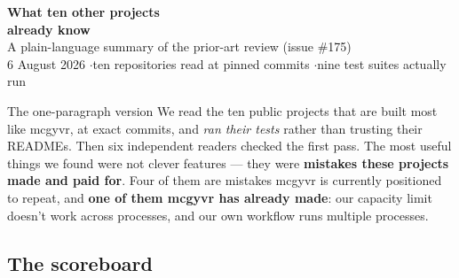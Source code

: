 \documentclass[11pt]{article}
\newcommand{\shout}[1]{\textbf{#1}}
\begin{document}
\begin{center}
{\Huge\bfseries What ten other projects\\[4pt] already know}\\[10pt]
{\large\color{muted} A plain-language summary of the prior-art review (issue \#175)}\\[4pt]
{\small\color{muted} 6 August 2026 \quad$\cdot$\quad ten repositories read at pinned commits \quad$\cdot$\quad nine test suites actually run}
\end{center}

\vspace{6pt}

\begin{keybox}{The one-paragraph version}
We read the ten public projects that are built most like mcgyvr, at exact
commits, and \emph{ran their tests} rather than trusting their READMEs. Then six
independent readers checked the first pass. The most useful things we found were
not clever features --- they were \shout{mistakes these projects made and paid
for}. Four of them are mistakes mcgyvr is currently positioned to repeat, and
\shout{one of them mcgyvr has already made}: our capacity limit doesn't work
across processes, and our own workflow runs multiple processes.
\end{keybox}

\vspace{-2pt}

\subsection*{The scoreboard}

\begin{center}
\end{center}
\end{document}
